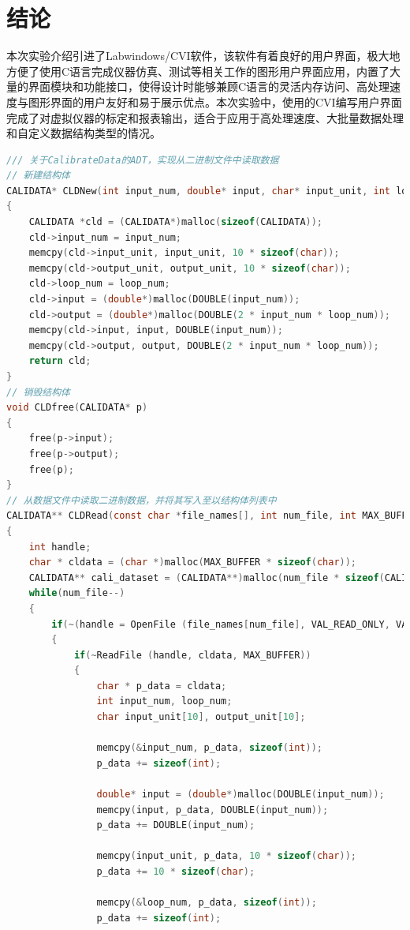 \documentclass[a4paper,12pt,twoside]{article}%
\begin{document}
\section{结论}
本次实验介绍引进了Labwindows/CVI软件，该软件有着良好的用户界面，极大地方便了使用C语言完成仪器仿真、测试等相关工作的图形用户界面应用，内置了大量的界面模块和功能接口，使得设计时能够兼顾C语言的灵活内存访问、高处理速度与图形界面的用户友好和易于展示优点。本次实验中，使用的CVI编写用户界面完成了对虚拟仪器的标定和报表输出，适合于应用于高处理速度、大批量数据处理和自定义数据结构类型的情况。
\newpage
\appendix
\appendixpage
\addappheadtotoc
{}
\begin{lstlisting}[language=C]
/// 关于CalibrateData的ADT，实现从二进制文件中读取数据
// 新建结构体
CALIDATA* CLDNew(int input_num, double* input, char* input_unit, int loop_num, char* output_unit, double* output)
{
	CALIDATA *cld = (CALIDATA*)malloc(sizeof(CALIDATA));
	cld->input_num = input_num;
	memcpy(cld->input_unit, input_unit, 10 * sizeof(char));
	memcpy(cld->output_unit, output_unit, 10 * sizeof(char));
	cld->loop_num = loop_num;
	cld->input = (double*)malloc(DOUBLE(input_num));
	cld->output = (double*)malloc(DOUBLE(2 * input_num * loop_num));
	memcpy(cld->input, input, DOUBLE(input_num));
	memcpy(cld->output, output, DOUBLE(2 * input_num * loop_num));
	return cld;
}
// 销毁结构体
void CLDfree(CALIDATA* p)
{
	free(p->input);
	free(p->output);
	free(p);
}
// 从数据文件中读取二进制数据，并将其写入至以结构体列表中
CALIDATA** CLDRead(const char *file_names[], int num_file, int MAX_BUFFER)
{
	int handle;
	char * cldata = (char *)malloc(MAX_BUFFER * sizeof(char));
	CALIDATA** cali_dataset = (CALIDATA**)malloc(num_file * sizeof(CALIDATA*));
	while(num_file--)
	{
		if(~(handle = OpenFile (file_names[num_file], VAL_READ_ONLY, VAL_OPEN_AS_IS, VAL_BINARY)))
		{
			if(~ReadFile (handle, cldata, MAX_BUFFER))
			{
				char * p_data = cldata;
				int input_num, loop_num;
				char input_unit[10], output_unit[10];
				
				memcpy(&input_num, p_data, sizeof(int));
				p_data += sizeof(int);
				
				double* input = (double*)malloc(DOUBLE(input_num));
				memcpy(input, p_data, DOUBLE(input_num));
				p_data += DOUBLE(input_num);
				
				memcpy(input_unit, p_data, 10 * sizeof(char));
				p_data += 10 * sizeof(char);
				
				memcpy(&loop_num, p_data, sizeof(int));
				p_data += sizeof(int);
				

\end{lstlisting}
\end{document}
